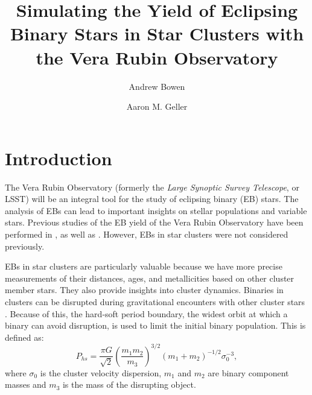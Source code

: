 \documentclass[RNAAS]{aastex63}
\begin{document}
\title{Simulating the Yield of Eclipsing Binary Stars in Star Clusters with the Vera Rubin Observatory}


\author{Andrew Bowen}

\author{Aaron M. Geller}



\section{Introduction}
\label{sec:Intro}
The Vera Rubin Observatory (formerly the \textit{Large Synoptic Survey Telescope}, or LSST) will be an integral tool for the study of eclipsing binary (EB) stars. The analysis of EBs can lead to important insights on stellar populations and variable stars. Previous studies of the EB yield of the Vera Rubin Observatory have been performed in \citet{2011AJ....142...52P}, \citet{2017PASP..129f5003W} as well as \citet{2019AAS...23336317P}. However, EBs in star clusters were not considered previously. 

EBs in star clusters are particularly valuable because we have more precise measurements of their distances, ages, and metallicities based on other cluster member stars. They also provide insights into cluster dynamics. Binaries in clusters can be disrupted during gravitational encounters with other cluster stars \citep{2015ApJ...808L..25G}. Because of this, the hard-soft period boundary, the widest orbit at which a binary can avoid disruption, is used to limit the initial binary population. This is defined as:
\begin{equation}
    \label{eq:hard-soft-boundary}
    P_{hs} = \frac{\pi G}{\sqrt{2}} \left( \frac{m_1m_2}{m_3} \right) ^{3/2}(m_1 + m_2)^{-1/2}\sigma_0^{-3} ,
\end{equation}
where $\sigma_0$ is the cluster velocity dispersion, $m_1$ and $m_2$ are binary component masses and $m_3$ is the mass of the disrupting object.
\end{document}
